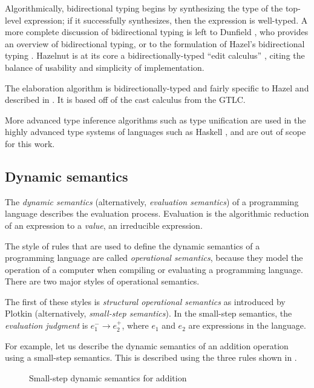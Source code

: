 Algorithmically, bidirectional typing begins by synthesizing the type of the top-level expression; if it successfully synthesizes, then the expression is well-typed. A more complete discussion of bidirectional typing is left to Dunfield \cite{Dunfield_2022}, who provides an overview of bidirectional typing, or to the formulation of Hazel's bidirectional typing \cite{conf/popl/Hazelnut17}. Hazelnut is at its core a bidirectionally-typed ``edit calculus'' \cite{conf/popl/Hazelnut17}, citing the balance of usability and simplicity of implementation.

The elaboration algorithm is bidirectionally-typed and fairly specific to Hazel and described in . It is based off of the cast calculus from the GTLC.

More advanced type inference algorithms such as type unification are used in the highly advanced type systems of languages such as Haskell \cite{gundry2013type}, and are out of scope for this work.

\subsection{Dynamic semantics}
\label{sec:dynamic-semantics}

The \textit{dynamic semantics} (alternatively, \textit{evaluation semantics}) of a programming language describes the evaluation process. Evaluation is the algorithmic reduction of an expression to a \textit{value}, an irreducible expression.

The style of rules that are used to define the dynamic semantics of a programming language are called \textit{operational semantics}, because they model the operation of a computer when compiling or evaluating a programming language. There are two major styles of operational semantics.

The first of these styles is \textit{structural operational semantics} as introduced by Plotkin \cite{plotkin1981structural} (alternatively, \textit{small-step semantics}). In the small-step semantics, the \textit{evaluation judgment} is $e_1^-\to e_2^+$, where $e_1$ and $e_2$ are expressions in the language.

For example, let us describe the dynamic semantics of an addition operation using a small-step semantics. This is described using the three rules shown in .

\begin{figure}
  \centering
  \begin{mdframed}
    \begin{singlespace}
    \end{singlespace}
  \end{mdframed}
  \caption{Small-step dynamic semantics for addition}
  \label{fig:small-step-addition}
\end{figure}

